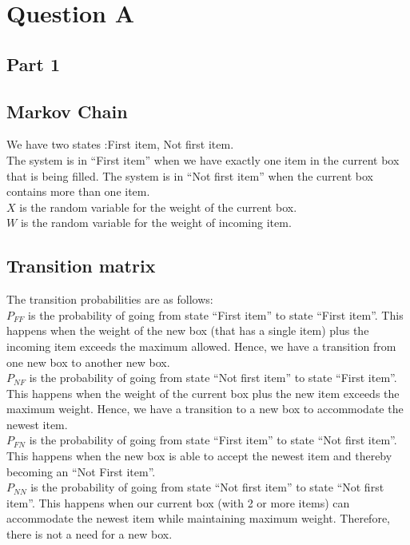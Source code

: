 \documentclass[10pt,a4paper]{article}
\begin{document}
\section{Question A}
\subsection{Part 1}
\subsection*{Markov Chain}
We have two states :{First item, Not first item}. \\
The system is in ``First item'' when we have exactly one item in the current box that is being filled. The system is in ``Not first item'' when the current box contains more than one item.\\
$ X $ is the random variable for the weight of the current box.\\
$ W $ is the random variable for the weight of incoming item.\\
\subsection*{Transition matrix}
The transition probabilities are as follows:\\
$ P_{FF} $ is the probability of going from state ``First item'' to state ``First item''. This happens when the weight of the new box (that has a single item) plus the incoming item exceeds the maximum allowed. Hence, we have a transition from one new box to another new box.\\
$ P_{NF} $ is the probability of going from state ``Not first item'' to state ``First item''. This happens when the weight of the current box plus the new item exceeds the maximum weight. Hence, we have a transition to a new box to accommodate the newest item.\\
$ P_{FN} $ is the probability of going from state ``First item'' to state ``Not first item''. This happens when the new box is able to accept the newest item and thereby becoming an ``Not First item''.\\
$ P_{NN} $ is the probability of going from state ``Not first item'' to state ``Not first item''. This happens when our current box (with 2 or more items) can accommodate the newest item while maintaining maximum weight. Therefore, there is not a need for a new box. \\
\end{document}
